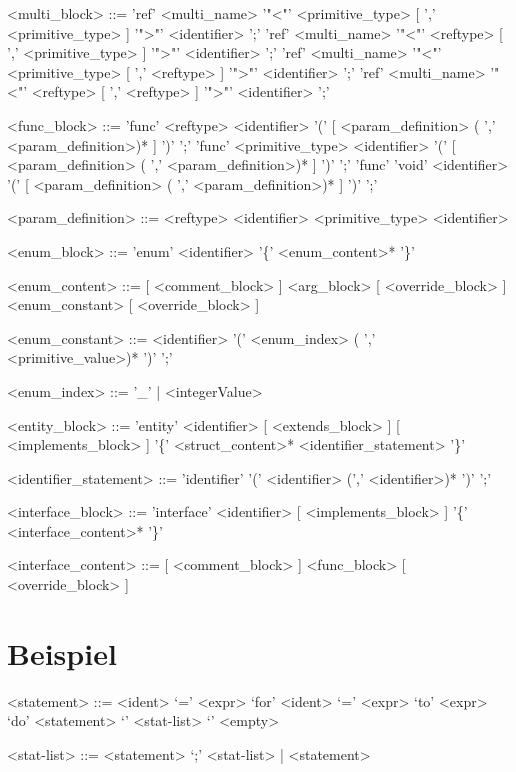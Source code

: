 \documentclass[./einleitung.tex]{subfiles}
\begin{document}
\begin{grammar}
<multi_block> ::= 'ref' <multi_name> '"<"' <primitive_type> [ ',' <primitive_type> ] '">"' <identifier> ';'
\alt 'ref' <multi_name> '"<"' <reftype> [ ',' <primitive_type> ] '">"' <identifier> ';'
\alt 'ref' <multi_name> '"<"' <primitive_type> [ ',' <reftype> ] '">"' <identifier> ';'
\alt 'ref' <multi_name> '"<"' <reftype> [ ',' <reftype> ] '">"' <identifier> ';'

<func_block> ::= 'func' <reftype> <identifier> '(' [ <param_definition> ( ',' <param_definition>)* ] ')' ';'
\alt 'func' <primitive_type> <identifier> '(' [ <param_definition> ( ',' <param_definition>)* ] ')' ';'
\alt 'func' 'void' <identifier> '(' [ <param_definition> ( ',' <param_definition>)* ] ')' ';'

<param_definition> ::= <reftype> <identifier>
\alt <primitive_type> <identifier>

<enum_block> ::= 'enum' <identifier> '\{' <enum_content>* '\}'

<enum_content> ::= [ <comment_block> ] <arg_block> [ <override_block> ]
 <enum_constant> [ <override_block> ]

<enum_constant> ::= <identifier> '(' <enum_index> ( ',' <primitive_value>)* ')' ';'

<enum_index> ::= '_' | <integerValue>

<entity_block> ::= 'entity' <identifier> [ <extends_block> ] [ <implements_block> ] '\{' <struct_content>* <identifier_statement> '\}' 

<identifier_statement> ::= 'identifier' '(' <identifier> (',' <identifier>)* ')' ';'

<interface_block> ::= 'interface' <identifier> [ <implements_block> ] '\{' <interface_content>* '\}'

<interface_content> ::= [ <comment_block> ] <func_block> [ <override_block> ]
\end{grammar}

\section{Beispiel}
\setlength{\grammarparsep}{20pt plus 1pt minus 1pt} %
\setlength{\grammarindent}{12em} %

\begin{grammar}
<statement> ::= <ident> `=' <expr> 
\alt `for' <ident> `=' <expr> `to' <expr> `do' <statement> 
\alt `{' <stat-list> `}' 
\alt <empty> 

<stat-list> ::= <statement> `;' <stat-list> | <statement> 

\end{grammar}
\end{document}
